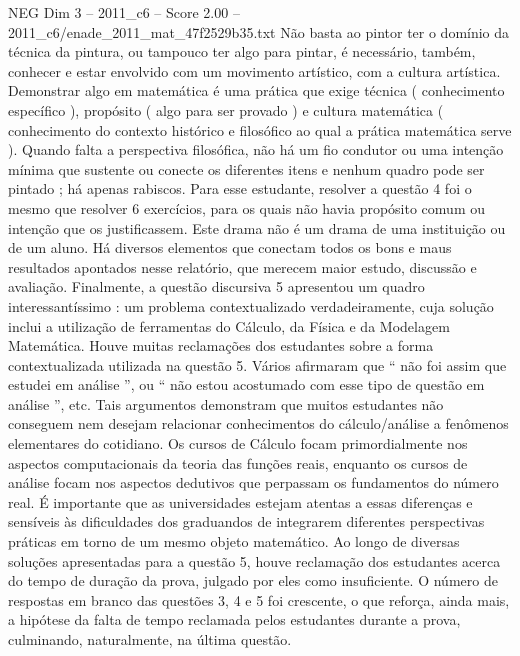 \begin{textsample}{NEG Dim 3 – 2011\_c6 – Score 2.00 – 2011\_c6/enade\_2011\_mat\_47f2529b35.txt}
Não basta ao pintor ter o domínio da técnica da pintura, ou tampouco ter algo para pintar, é necessário, também, conhecer e estar envolvido com um movimento artístico, com a cultura artística.
Demonstrar algo em matemática é uma prática que exige técnica ( conhecimento específico ), propósito ( algo para ser provado ) e cultura matemática ( conhecimento do contexto histórico e filosófico ao qual a prática matemática serve ).
Quando falta a perspectiva filosófica, não há um fio condutor ou uma intenção mínima que sustente ou conecte os diferentes itens e nenhum quadro pode ser pintado ; há apenas rabiscos.
Para esse estudante, resolver a questão 4 foi o mesmo que resolver 6 exercícios, para os quais não havia propósito comum ou intenção que os justificassem.
Este drama não é um drama de uma instituição ou de um aluno.
Há diversos elementos que conectam todos os bons e maus resultados apontados nesse relatório, que merecem maior estudo, discussão e avaliação.
Finalmente, a questão discursiva 5 apresentou um quadro interessantíssimo : um problema contextualizado verdadeiramente, cuja solução inclui a utilização de ferramentas do Cálculo, da Física e da Modelagem Matemática.
Houve muitas reclamações dos estudantes sobre a forma contextualizada utilizada na questão 5.
Vários afirmaram que “ não foi assim que estudei em análise ”, ou “ não estou acostumado com esse tipo de questão em análise ”, etc.
Tais argumentos demonstram que muitos estudantes não conseguem nem desejam relacionar conhecimentos do cálculo/análise a fenômenos elementares do cotidiano.
Os cursos de Cálculo focam primordialmente nos aspectos computacionais da teoria das funções reais, enquanto os cursos de análise focam nos aspectos dedutivos que perpassam os fundamentos do número real.
É importante que as universidades estejam atentas a essas diferenças e sensíveis às dificuldades dos graduandos de integrarem diferentes perspectivas práticas em torno de um mesmo objeto matemático.
Ao longo de diversas soluções apresentadas para a questão 5, houve reclamação dos estudantes acerca do tempo de duração da prova, julgado por eles como insuficiente.
O número de respostas em branco das questões 3, 4 e 5 foi crescente, o que reforça, ainda mais, a hipótese da falta de tempo reclamada pelos estudantes durante a prova, culminando, naturalmente, na última questão.

\end{textsample}
